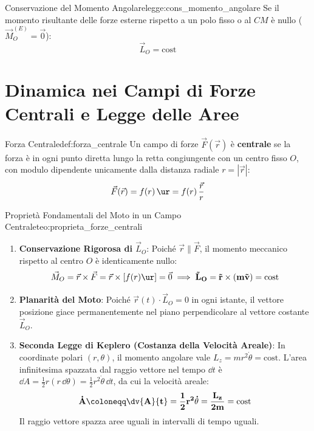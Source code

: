 \begin{legge}{Conservazione del Momento Angolare}{legge:cons_momento_angolare}
Se il momento risultante delle forze esterne rispetto a un polo fisso o al $CM$ è nullo ($\vec{M}_O^{(E)} = \vec{0}$):
\begin{equation}
    \vec{L}_O = \text{cost}
    \label{eq:cons_L}
\end{equation}
\end{legge}

\section{Dinamica nei Campi di Forze Centrali e Legge delle Aree}
\label{sec:forze_centrali}

\begin{definizione}{Forza Centrale}{def:forza_centrale}
Un campo di forze $\vec{F}(\vec{r})$ è \textbf{centrale} se la forza è in ogni punto diretta lungo la retta congiungente con un centro fisso $O$, con modulo dipendente unicamente dalla distanza radiale $r = |\vec{r}|$:
\begin{equation}
    \vec{F}(\vec{r}) = f(r)\,\ur = f(r)\,\frac{\vec{r}}{r}
    \label{eq:campo_centrale}
\end{equation}
\end{definizione}

\begin{teorema}{Proprietà Fondamentali del Moto in un Campo Centrale}{teo:proprieta_forze_centrali}
\begin{enumerate}
    \item \textbf{Conservazione Rigorosa di $\vec{L}_O$}: Poiché $\vec{r} \parallel \vec{F}$, il momento meccanico rispetto al centro $O$ è identicamente nullo:
    \begin{equation}
        \vec{M}_O = \vec{r} \times \vec{F} = \vec{r} \times [f(r)\ur] = \vec{0} \implies \mathbf{\vec{L}_O = \vec{r}\times(m\vec{v}) = \text{cost}}
    \end{equation}
    \item \textbf{Planarità del Moto}: Poiché $\vec{r}(t)\cdot\vec{L}_O = 0$ in ogni istante, il vettore posizione giace permanentemente nel piano perpendicolare al vettore costante $\vec{L}_O$.
    \item \textbf{Seconda Legge di Keplero (Costanza della Velocità Areale)}: In coordinate polari $(r, \theta)$, il momento angolare vale $L_z = m r^2 \dot{\theta} = \text{cost}$. L'area infinitesima spazzata dal raggio vettore nel tempo $\dd t$ è $\dd A = \frac{1}{2}r (r\,\dd\theta) = \frac{1}{2}r^2\dot{\theta}\,\dd t$, da cui la velocità areale:
    \begin{equation}
        \mathbf{\dot{A} \coloneqq \dv{A}{t} = \frac{1}{2}r^2\dot{\theta} = \frac{L_z}{2m} = \text{cost}}
        \label{eq:velocita_areale}
    \end{equation}
    Il raggio vettore spazza aree uguali in intervalli di tempo uguali.
\end{enumerate}
\end{teorema}

